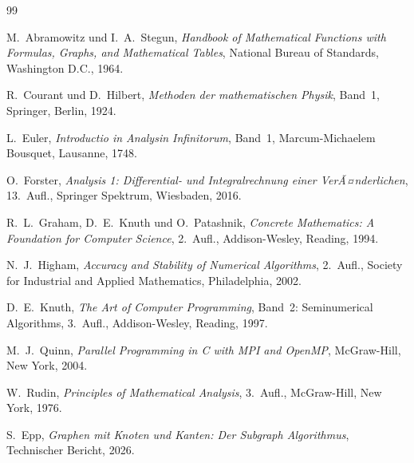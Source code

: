 ﻿\documentclass[a4paper,12pt]{article}
\theoremstyle{definition}
\begin{document}
\begin{thebibliography}{99}

M.~Abramowitz und I.~A.~Stegun,
\textit{Handbook of Mathematical Functions with Formulas, Graphs, and Mathematical Tables},
National Bureau of Standards, Washington D.C., 1964.

R.~Courant und D.~Hilbert,
\textit{Methoden der mathematischen Physik}, Band~1,
Springer, Berlin, 1924.

L.~Euler,
\textit{Introductio in Analysin Infinitorum}, Band~1,
Marcum-Michaelem Bousquet, Lausanne, 1748.

O.~Forster,
\textit{Analysis 1: Differential- und Integralrechnung einer VerÃ¤nderlichen},
13.~Aufl., Springer Spektrum, Wiesbaden, 2016.

R.~L.~Graham, D.~E.~Knuth und O.~Patashnik,
\textit{Concrete Mathematics: A Foundation for Computer Science},
2.~Aufl., Addison-Wesley, Reading, 1994.

N.~J.~Higham,
\textit{Accuracy and Stability of Numerical Algorithms},
2.~Aufl., Society for Industrial and Applied Mathematics, Philadelphia, 2002.

D.~E.~Knuth,
\textit{The Art of Computer Programming}, Band~2: Seminumerical Algorithms,
3.~Aufl., Addison-Wesley, Reading, 1997.

M.~J.~Quinn,
\textit{Parallel Programming in C with MPI and OpenMP},
McGraw-Hill, New York, 2004.

W.~Rudin,
\textit{Principles of Mathematical Analysis},
3.~Aufl., McGraw-Hill, New York, 1976.

S.~Epp,
\textit{Graphen mit Knoten und Kanten: Der Subgraph Algorithmus}, Technischer Bericht, 2026.

\end{thebibliography}
\end{document}
